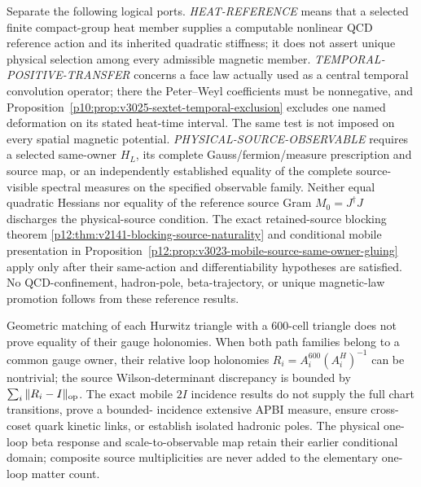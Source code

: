 \documentclass[12pt,a4paper]{article}
\begin{document}
\begin{remark}
\label{p12:rem:v3025-qcd-action-selection-ports}
Separate the following logical ports.  \emph{HEAT-REFERENCE} means
that a selected finite compact-group heat member supplies a computable
nonlinear QCD reference action and its inherited quadratic stiffness;
it does not assert unique physical selection among every admissible
magnetic member.  \emph{TEMPORAL-POSITIVE-TRANSFER} concerns a face law
actually used as a central temporal convolution operator; there the
Peter--Weyl coefficients must be nonnegative, and
Proposition~\ref{p10:prop:v3025-sextet-temporal-exclusion}
excludes one named deformation on its stated heat-time interval.
The same test is not imposed on every spatial magnetic potential.
\emph{PHYSICAL-SOURCE-OBSERVABLE} requires a selected same-owner
$H_L$, its complete Gauss/fermion/measure prescription and source map,
or an independently established equality of the complete source-visible
spectral measures on the specified observable family.  Neither equal
quadratic Hessians nor equality of the reference source Gram
$M_0=J^\dagger J$ discharges the physical-source condition.
The exact retained-source blocking theorem
\ref{p12:thm:v2141-blocking-source-naturality} and conditional mobile
presentation in
Proposition~\ref{p12:prop:v3023-mobile-source-same-owner-gluing}
apply only after their same-action and differentiability hypotheses
are satisfied.  No QCD-confinement, hadron-pole, beta-trajectory, or
unique magnetic-law promotion follows from these reference results.
\end{remark}


\begin{remark}
\label{p12:rem:v3023-mobile-2i-holonomy-frontier}
Geometric matching of each Hurwitz triangle with a 600-cell
triangle does not prove equality of their gauge holonomies.
When both path families belong to a common gauge owner, their
relative loop holonomies $R_i=A_i^{600}(A_i^H)^{-1}$ can be
nontrivial; the source Wilson-determinant discrepancy is bounded
by $\sum_i\|R_i-I\|_{\rm op}$. The exact mobile $2I$ incidence
results do not supply the full chart transitions, prove a bounded-
incidence extensive APBI measure, ensure cross-coset quark kinetic
links, or establish isolated hadronic poles. The physical one-loop
beta response and scale-to-observable map retain their earlier
conditional domain; composite source multiplicities are never
added to the elementary one-loop matter count.
\end{remark}
\end{document}
